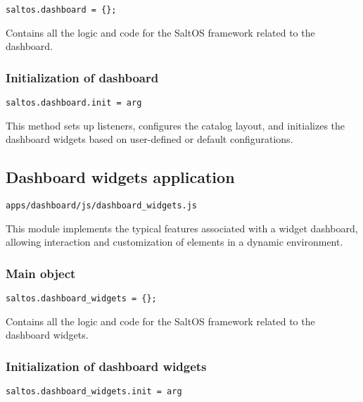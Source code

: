 \documentclass[a4paper]{article}
\begin{document}
\begin{lstlisting}
saltos.dashboard = {};
\end{lstlisting}

Contains all the logic and code for the SaltOS framework related to the dashboard.

\hypertarget{toc54}{}
\subsubsection{Initialization of dashboard}

\begin{lstlisting}
saltos.dashboard.init = arg
\end{lstlisting}

This method sets up listeners, configures the catalog layout, and initializes
the dashboard widgets based on user-defined or default configurations.

\hypertarget{toc55}{}
\subsection{Dashboard widgets application}

\begin{lstlisting}
apps/dashboard/js/dashboard_widgets.js
\end{lstlisting}

This module implements the typical features associated with a widget dashboard,
allowing interaction and customization of elements in a dynamic environment.

\hypertarget{toc56}{}
\subsubsection{Main object}

\begin{lstlisting}
saltos.dashboard_widgets = {};
\end{lstlisting}

Contains all the logic and code for the SaltOS framework related to the dashboard widgets.

\hypertarget{toc57}{}
\subsubsection{Initialization of dashboard widgets}

\begin{lstlisting}
saltos.dashboard_widgets.init = arg
\end{lstlisting}
\end{document}
